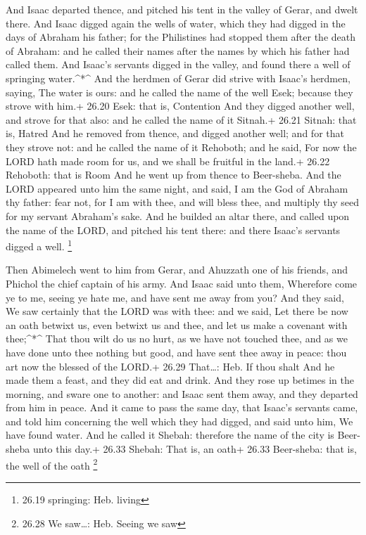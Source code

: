  And Isaac departed thence, and pitched his tent in the
valley of Gerar, and dwelt there.  And Isaac digged again
the wells of water, which they had digged in the days of Abraham his
father; for the Philistines had stopped them after the death of Abraham:
and he called their names after the names by which his father had called
them.  And Isaac's servants digged in the valley, and found
there a well of springing water.\^{}*\^{}  And the herdmen
of Gerar did strive with Isaac's herdmen, saying, The water is ours: and
he called the name of the well Esek; because they strove with him.+
26.20 Esek: that is, Contention  And they digged another
well, and strove for that also: and he called the name of it Sitnah.+
26.21 Sitnah: that is, Hatred  And he removed from thence,
and digged another well; and for that they strove not: and he called the
name of it Rehoboth; and he said, For now the LORD hath made room for
us, and we shall be fruitful in the land.+ 26.22 Rehoboth: that is Room
 And he went up from thence to Beer-sheba. 
And the LORD appeared unto him the same night, and said, I am the God of
Abraham thy father: fear not, for I am with thee, and will bless thee,
and multiply thy seed for my servant Abraham's sake.  And
he builded an altar there, and called upon the name of the LORD, and
pitched his tent there: and there Isaac's servants digged a well.
\footnote{26.19 springing: Heb. living}

 Then Abimelech went to him from Gerar, and Ahuzzath one of
his friends, and Phichol the chief captain of his army. 
And Isaac said unto them, Wherefore come ye to me, seeing ye hate me,
and have sent me away from you?  And they said, We saw
certainly that the LORD was with thee: and we said, Let there be now an
oath betwixt us, even betwixt us and thee, and let us make a covenant
with thee;\^{}*\^{}  That thou wilt do us no hurt, as we
have not touched thee, and as we have done unto thee nothing but good,
and have sent thee away in peace: thou art now the blessed of the LORD.+
26.29 That\ldots: Heb. If thou shalt  And he made them a
feast, and they did eat and drink.  And they rose up
betimes in the morning, and sware one to another: and Isaac sent them
away, and they departed from him in peace.  And it came to
pass the same day, that Isaac's servants came, and told him concerning
the well which they had digged, and said unto him, We have found water.
 And he called it Shebah: therefore the name of the city is
Beer-sheba unto this day.+ 26.33 Shebah: That is, an oath+ 26.33
Beer-sheba: that is, the well of the oath \footnote{26.28 We saw\ldots:
  Heb. Seeing we saw}


